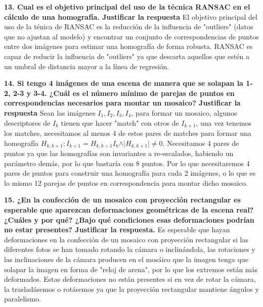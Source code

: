 \documentclass[12pt,a4paper]{article}
\begin{document}
	\newpage
	\textbf{13. Cual es el objetivo principal del uso de la técnica RANSAC en el cálculo de una homografía. Justificar la respuesta}
	\newline\newline
	El objetivo principal del uso de la ténica de RANSAC es la reducción de la influencia de "outliers" (datos que no ajustan al modelo) y encontrar un conjunto de correspondencias de puntos entre dos imágenes para estimar una homografía de forma robusta.
	RANSAC es capaz de reducir la influencia de "outliers" ya que descarta aquellos que estén a un umbral de distancia mayor a la línea de regresión.
	
	\newpage
	\textbf{14. Si tengo 4 imágenes de una escena de manera que se solapan la 1-2, 2-3 y 3-4. ¿Cuál es el número mínimo de parejas de puntos en correspondencias necesarios para montar un mosaico? Justificar la respuesta}
	\newline\newline
	Sean las imágenes $I_1, I_2, I_3, I_4$, para formar un mosaico, algunos descriptores de $I_k$ tienen que hacer "match" con otros de $I_{k+1}$, una vez tenemos los matches, necesitamos al menos 4 de estos pares de matches para formar una homografía $H_{k, k+1} : I_{k+1}=H_{k, k+1}I_{k}\wedge \vert H_{k, k+1}\vert\neq 0$. Necesitamos 4 pares de puntos ya que las homografías son invariantes a re-escalados, habiendo un parámetro demás, por lo que bastaría con 8 puntos. Por lo que necesitaremos 4 pares de puntos para construir una homografía para cada 2 imágenes, o lo que es lo mismo 12 parejas de puntos en correspondencia para montar dicho mosaico.
	
	
	
	\newpage
	\textbf{15. ¿En la confección de un mosaico con proyección rectangular es esperable que aparezcan deformaciones geométricas de la escena real?¿Cuáles y por qué? ¿Bajo qué condiciones esas deformaciones podrían no estar presentes? Justificar la respuesta.}
	\newline\newline
	Es esperable que hayan deformaciones en la confección de un mosaico con proyección rectangular si las diferentes fotos se han tomado rotando la cámara o inclinándola, las rotaciones y las inclinaciones de la cámara producen en el mosáico que la imagen tenga que solapar la imagen en forma de "reloj de arena", por lo que los extremos están más deformados.\newline
	Estas deformaciones no están presentes si en vez de rotar la cámara, la trasladásemos o rotásemos ya que la proyección rectangular mantiene ángulos y paralelismo. 
	
\end{document}
